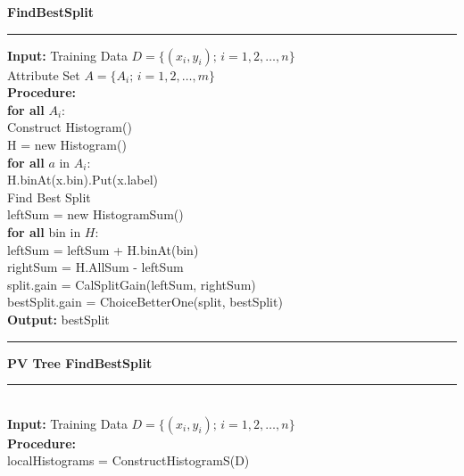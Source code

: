 \documentclass[a4paper]{article}
\begin{document}
\begin{itemize}
				\textbf{FindBestSplit}\\
				\noindent\rule[0.10\baselineskip]{\textwidth}{0.5pt}
						\textbf{Input:} Training Data $D=\{(x_i,y_i);\, i = 1,2,\dots, n\}$\\
						\hspace*{32pt} Attribute Set $A = \{A_i;\,i=1,2,\dots,m\}$\\
						\textbf{Procedure:}\\
						\hspace*{32pt} \textbf{for all} $A_i$:\\
						\hspace*{48pt}	Construct Histogram()\\
						\hspace*{48pt}	H = new Histogram()\\
						\hspace*{48pt}  \textbf{for all} $a$ in $A_i$:\\
						\hspace*{64pt}	H.binAt(x.bin).Put(x.label)\\
						\hspace*{48pt}  Find Best Split\\
						\hspace*{48pt}  leftSum = new HistogramSum()\\
						\hspace*{48pt}  \textbf{for all} bin in $H$:\\
						\hspace*{64pt}  leftSum = leftSum + H.binAt(bin)\\
						\hspace*{64pt}  rightSum = H.AllSum - leftSum\\
						\hspace*{64pt}  split.gain = CalSplitGain(leftSum, rightSum)\\
						\hspace*{64pt}  bestSplit.gain = ChoiceBetterOne(split, bestSplit)\\
						\textbf{Output:} bestSplit\\
				\noindent\rule[0.10\baselineskip]{\textwidth}{0.5pt}
				\textbf{PV Tree FindBestSplit}\\
				\noindent\rule[0.10\baselineskip]{\textwidth}{0.5pt}\\
						\textbf{Input:} Training Data $D=\{(x_i,y_i);\, i = 1,2,\dots, n\}$\\
						\textbf{Procedure:}\\
						\hspace*{32pt}	localHistograms = ConstructHistogramS(D)\\

\end{itemize}
\end{document}
